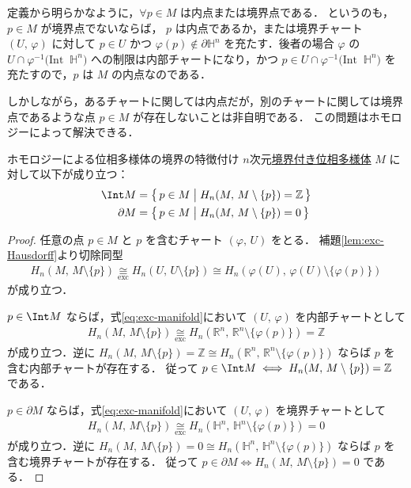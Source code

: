 \documentclass[algtopo_main]{subfiles}
\begin{document}
定義から明らかなように，$\forall p \in M$ は内点または境界点である．
というのも，$p \in M$ が境界点でないならば， $p$ は内点であるか，または境界チャート $(U,\, \varphi)$ に対して $p \in U$ かつ $\varphi(p) \notin \partial \mathbb{H}^n$ を充たす．後者の場合 $\varphi$ の $U \cap \varphi^{-1}\bigl(\mathrm{Int}\mathop{} \mathbb{H}^n\bigr)$ への制限は内部チャートになり，かつ $p \in U \cap \varphi^{-1}\bigl(\mathrm{Int}\mathop{} \mathbb{H}^n\bigr)$ を充たすので，$p$ は $M$ の内点なのである．

しかしながら，あるチャートに関しては内点だが，別のチャートに関しては境界点であるような点 $p \in M$ が存在しないことは非自明である．
この問題はホモロジーによって解決できる．

\begin{myprop}[label=prop:mani-boundary-homopogy]{ホモロジーによる位相多様体の境界の特徴付け}
    $n$次元\hyperref[def:mani-with-boundary]{境界付き位相多様体} $M$ に対して以下が成り立つ：
    \begin{align}
        \Int M &= \bigl\{\, p \in M \bigm| H_n(M,\, M\setminus \{p\}) = \mathbb{Z} \,\bigr\} \\
        \partial M &= \bigl\{\, p \in M \bigm| H_n(M,\, M\setminus \{p\}) = 0 \,\bigr\} 
    \end{align}
\end{myprop}

\begin{proof}
    任意の点 $p \in M$ と $p$ を含むチャート $(\varphi,\, U)$ をとる．
    補題\ref{lem:exc-Hausdorff}より切除同型
    \begin{align}
        \label{eq:exc-manifold}
        H_n(M,\, M\setminus \{p\}) \underset{\mathrm{exc}}{\cong} H_n (U,\, U \setminus \{p\}) \cong H_n (\varphi(U),\, \varphi(U) \setminus \{\varphi(p)\})
    \end{align}
    が成り立つ．

    $p \in \Int M$ ならば，式\eqref{eq:exc-manifold}において $(U,\, \varphi)$ を内部チャートとして
    \begin{align}
        H_n(M,\, M\setminus \{p\}) \underset{\mathrm{exc}}{\cong} H_n (\mathbb{R}^n,\, \mathbb{R}^n \setminus \{\varphi(p)\}) = \mathbb{Z}
    \end{align}
    が成り立つ．逆に $H_n(M,\, M\setminus \{p\}) = \mathbb{Z} \cong H_n (\mathbb{R}^n,\, \mathbb{R}^n \setminus \{\varphi(p)\})$ ならば $p$ を含む内部チャートが存在する．
    従って $p \in \Int M \iff H_n(M,\, M\setminus \{p\}) = \mathbb{Z}$ である．

    $p \in \partial M$ ならば，式\eqref{eq:exc-manifold}において $(U,\, \varphi)$ を境界チャートとして
    \begin{align}
        H_n(M,\, M\setminus \{p\}) \underset{\mathrm{exc}}{\cong} H_n (\mathbb{H}^n,\, \mathbb{H}^n \setminus \{\varphi(p)\}) = 0
    \end{align}
    が成り立つ．逆に $H_n(M,\, M\setminus \{p\}) = 0 \cong H_n (\mathbb{H}^n,\, \mathbb{H}^n \setminus \{\varphi(p)\})$ ならば $p$ を含む境界チャートが存在する．
    従って $p \in \partial M \iff H_n(M,\, M\setminus \{p\}) = 0$ である．
\end{proof}
\end{document}
